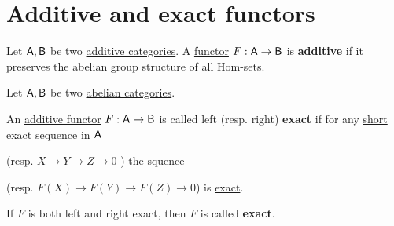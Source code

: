 \documentclass[../../../main]{subfiles}
\begin{document}
\section{Additive and exact functors}

\begin{definition} \label{def:additive-functor}
  Let \(\mathsf{A}, \mathsf{B}\) be two \hyperref[def:additive-category]{additive categories}. A \hyperref[def:functor]{functor} \(F: \mathsf{A} \to \mathsf{B}\) is \textbf{additive} if it preserves the abelian group structure of all Hom-sets.
\end{definition}

\begin{definition} \label{def:exact-functor}
  Let \(\mathsf{A}, \mathsf{B}\) be two \hyperref[def:abelian-category]{abelian categories}.

  An \hyperref[def:additive-functor]{additive functor} \(F: \mathsf{A} \to \mathsf{B}\) is called left (resp. right) \textbf{exact} if for any \hyperref[def:short-exact-sequence]{short exact sequence} in \(\mathsf{A}\)
  \begin{center}
  \end{center}
  (resp. \(X \to Y \to Z \to 0\) ) the squence
  \begin{center}
  \end{center}
  (resp. \(F(X) \to F(Y) \to F(Z) \to 0\)) is \hyperref[def:short-exact-sequence]{exact}.

  If \(F\) is both left and right exact, then \(F\) is called \textbf{exact}.
\end{definition}
\end{document}
